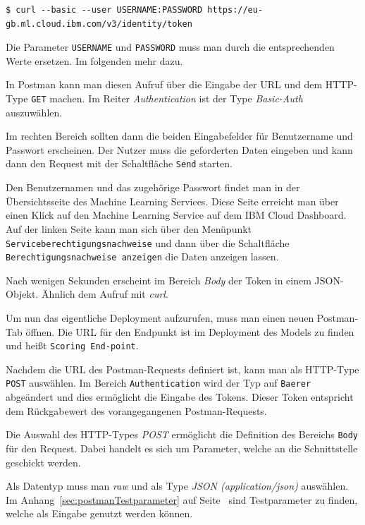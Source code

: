 \begin{lstlisting}[caption=Abruf des Auth-Tokens, label=ls:umsetzung_apitoken]
$ curl --basic --user USERNAME:PASSWORD https://eu-gb.ml.cloud.ibm.com/v3/identity/token
\end{lstlisting}

Die Parameter \texttt{USERNAME} und \texttt{PASSWORD} muss man durch die entsprechenden Werte ersetzen. Im folgenden
mehr dazu.

In Postman kann man diesen Aufruf über die Eingabe der URL und dem HTTP-Type \texttt{GET} machen. Im Reiter
\textit{Authentication} ist der Type \textit{Basic-Auth} auszuwählen.

Im rechten Bereich sollten dann die beiden Eingabefelder für Benutzername und Passwort erscheinen. Der Nutzer muss die
geforderten Daten eingeben und kann dann den Request mit der Schaltfläche \texttt{Send} starten.

Den Benutzernamen und das zugehörige Passwort findet man in der Übersichtsseite des Machine Learning Services. Diese
Seite erreicht man über einen Klick auf den Machine Learning Service auf dem IBM Cloud Dashboard. Auf der linken Seite
kann man sich über den Menüpunkt \texttt{Serviceberechtigungsnachweise} und dann über die Schaltfläche
\texttt{Berechtigungsnachweise anzeigen} die Daten anzeigen lassen.

Nach wenigen Sekunden erscheint im Bereich \textit{Body} der Token in einem JSON-Objekt. Ähnlich dem Aufruf mit
\textit{curl}.

Um nun das eigentliche Deployment aufzurufen, muss man einen neuen Postman-Tab öffnen. Die URL für den Endpunkt ist im
Deployment des Models zu finden und heißt \texttt{Scoring End-point}.

Nachdem die URL des Postman-Requests definiert ist, kann man als HTTP-Type \texttt{POST} auswählen. Im Bereich
\texttt{Authentication} wird der Typ auf \texttt{Baerer} abgeändert und dies ermöglicht die Eingabe des Tokens. Dieser
Token entspricht dem Rückgabewert des vorangegangenen Postman-Requests.

Die Auswahl des HTTP-Types \textit{POST} ermöglicht die Definition des Bereichs \texttt{Body} für den Request. Dabei
handelt es sich um Parameter, welche an die Schnittstelle geschickt werden.

Als Datentyp muss man \textit{raw} und als Type \textit{JSON (application/json)} auswählen. Im
Anhang~\ref{sec:postmanTestparameter} auf Seite~\pageref{sec:postmanTestparameter} sind Testparameter zu finden, welche
als Eingabe genutzt werden können.

